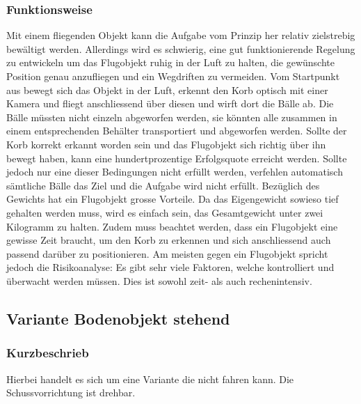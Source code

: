 \subsubsection{Funktionsweise}
Mit einem fliegenden Objekt kann die Aufgabe vom Prinzip her relativ zielstrebig bewältigt 
werden. Allerdings wird es schwierig, eine gut funktionierende Regelung zu entwickeln um das 
Flugobjekt ruhig in der Luft zu halten, die gewünschte Position genau 
anzufliegen und ein Wegdriften zu vermeiden. 
Vom Startpunkt aus bewegt sich das Objekt in der Luft, erkennt den Korb optisch 
mit einer Kamera und fliegt anschliessend über diesen und wirft dort die Bälle 
ab. Die Bälle müssten nicht einzeln abgeworfen werden, sie könnten alle zusammen 
in einem entsprechenden Behälter transportiert und abgeworfen 
werden. Sollte der Korb korrekt erkannt worden sein und das Flugobjekt sich 
richtig über ihn bewegt haben, kann eine hundertprozentige Erfolgsquote 
erreicht werden. Sollte jedoch nur eine dieser Bedingungen nicht erfüllt werden, verfehlen  
automatisch sämtliche Bälle das Ziel und die Aufgabe wird nicht erfüllt. 
Bezüglich des Gewichts hat ein Flugobjekt grosse Vorteile. Da das Eigengewicht 
sowieso tief gehalten werden muss, wird es einfach sein, das Gesamtgewicht 
unter zwei Kilogramm zu halten.
%
Zudem muss beachtet werden, dass ein Flugobjekt eine gewisse Zeit 
braucht, um den Korb zu erkennen und sich anschliessend auch passend darüber 
zu positionieren. Am meisten gegen ein Flugobjekt spricht jedoch die 
Risikoanalyse: Es gibt sehr viele Faktoren, welche kontrolliert und überwacht 
werden müssen. Dies ist sowohl zeit- als auch rechenintensiv. 



\clearpage

\subsection{Variante Bodenobjekt stehend}
\subsubsection{Kurzbeschrieb}
Hierbei handelt es sich um eine Variante die nicht fahren kann. Die Schussvorrichtung ist drehbar.

